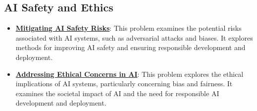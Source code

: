 \documentclass{article}%
\begin{document}
\subsection{AI Safety and Ethics}%
\label{subsec:AISafetyandEthics}%
\begin{itemize}[leftmargin=*]%
\item \href{https://purdue.brightspace.com/d2l/common/assets/pdfjs-d2l-dist/1.0.14-legacy/web/viewer.html?file=\%2Fcontent\%2Fenforced\%2F1095467-wl.202510.CS.24300.001\%2F02L2-Intro.pdf\%3Fou\%3D1095467\&lang=en-us\&container=d2l-fileviewer-rendered-pdf\&fullscreen=d2l-fileviewer-rendered-pdf-dialog\&height=667#page=19}{\textbf{Mitigating AI Safety Risks}}: This problem examines the potential risks associated with AI systems, such as adversarial attacks and biases. It explores methods for improving AI safety and ensuring responsible development and deployment.%
\item \href{https://purdue.brightspace.com/d2l/common/assets/pdfjs-d2l-dist/1.0.14-legacy/web/viewer.html?file=\%2Fcontent\%2Fenforced\%2F1095467-wl.202510.CS.24300.001\%2F02L2-Intro.pdf\%3Fou\%3D1095467\&lang=en-us\&container=d2l-fileviewer-rendered-pdf\&fullscreen=d2l-fileviewer-rendered-pdf-dialog\&height=667#page=20}{\textbf{Addressing Ethical Concerns in AI}}: This problem explores the ethical implications of AI systems, particularly concerning bias and fairness. It examines the societal impact of AI and the need for responsible AI development and deployment.%
\end{itemize}

%
\end{document}
